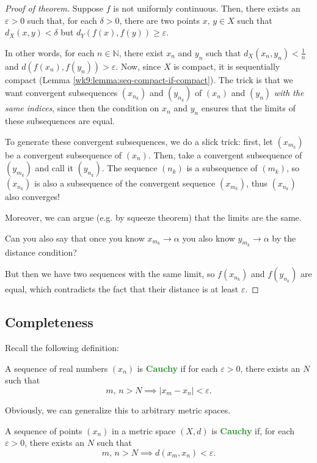 \documentclass[10pt]{scrartcl}
\providecommand{\eps}{\varepsilon}
\providecommand{\NN}{\mathbb N}
\providecommand{\RR}{\mathbb R}
\providecommand{\vocab}[1]{{\textbf{\textcolor{ForestGreen}{#1}}}}
\begin{document}
\begin{proof}[Proof of theorem]
	Suppose $f$ is not uniformly continuous.
	Then, there exists an $\eps > 0$ such that, for each $\delta > 0$,
	there are two points $x,\,y\in X$ such that
	$d_X(x, y) < \delta$ but $d_Y(f(x), f(y)) \ge \eps$.
	
	In other words, for each $n\in\NN$, there exist $x_n$ and $y_n$ such that
	$d_X(x_n, y_n) < \frac 1n$ and $d(f(x_n), f(y_n)) > \eps$.
	Now, since $X$ is compact, it is sequentially compact
	(Lemma \ref{wk9:lemma:seq-compact-if-compact}).
	The trick is that we want convergent subsequences
	$(x_{n_k})$ and $(y_{n_k})$ of $(x_n)$ and $(y_n)$
	\emph{with the same indices}, since then the condition on $x_n$ and $y_n$
	ensures that the limits of these subsequences are equal.
	
	To generate these convergent subsequences, we do a slick trick:
	first, let $(x_{m_k})$ be a convergent subsequence of $(x_n)$.
	Then, take a convergent subsequence of $(y_{m_k})$
	and call it $(y_{n_k})$. The sequence $(n_k)$ is a subsequence of $(m_k)$,
	so $(x_{n_k})$ is also a subsequence of the convergent sequence $(x_{m_k})$,
	thus $(x_{n_k})$ also converges!
	
	Moreover, we can argue (e.g. by squeeze theorem) that
	the limits are the same.
	
	\begin{remark}
		Can you also say that once you know $x_{m_k}\to\alpha$
		you also know $y_{m_k}\to\alpha$ by the distance condition?
	\end{remark}

	But then we have two sequences with the same limit,
	so $f(x_{n_k})$ and $f(y_{n_k})$ are equal,
	which contradicts the fact that their distance is at least $\eps$.
\end{proof}

\subsection{Completeness}
Recall the following definition:
\begin{definition}[Cauchy sequences in $\RR$]
	A sequence of real numbers $(x_n)$ is \vocab{Cauchy} if
	for each $\eps > 0$, there exists an $N$ such that
	\[m,\,n > N\implies |x_m - x_n| < \eps.\]
\end{definition}

Obviously, we can generalize this to arbitrary metric spaces.
\begin{definition}\label{wk10:def:cauchyseq}
	A sequence of points $(x_n)$ in a metric space $(X, d)$ is \vocab{Cauchy}
	if, for each $\eps > 0$, there exists an $N$ such that
	\[m,\,n > N\implies d(x_m, x_n) < \eps.\]
\end{definition}
\end{document}
